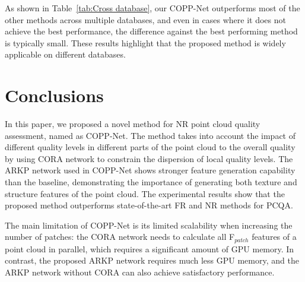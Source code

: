 \documentclass[conference]{IEEEtran}
\begin{document}
As shown in Table~\ref{tab:Cross database}, our COPP-Net outperforms most of the other methods across multiple databases, and even in cases where it does not achieve the best performance, the difference against the best performing method is typically small. These results highlight that the proposed method is widely applicable on different databases.

\section{Conclusions}
In this paper, we proposed a novel method for NR point cloud quality assessment, named as COPP-Net. The method takes into account the impact of different quality levels in different parts of the point cloud to the overall quality by using CORA network to constrain the dispersion of local quality levels. The ARKP network used in COPP-Net shows stronger feature generation capability than the baseline, demonstrating the importance of generating both texture and structure features of the point cloud. The experimental results show that the proposed method outperforms state-of-the-art FR and NR methods for PCQA.

The main limitation of COPP-Net is its limited scalability when increasing the number of patches: the CORA network needs to calculate all F$_{patch}$ features of a point cloud in parallel, which requires a significant amount of GPU memory. In contrast, the proposed ARKP network requires much less GPU memory, and the ARKP network without CORA can also achieve satisfactory performance.



                  
\end{document}
